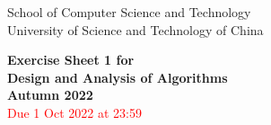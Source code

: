 \documentclass[a4paper,10pt]{article}
\begin{document}
\begin{minipage}[b]{0.58\textwidth}
	\centering
	\large
	School of Computer Science and Technology\\University of Science and Technology of China
\end{minipage}

\hrulefill

\vspace{0.2cm}
\begin{center}
	{\large \bf Exercise Sheet 1 for \\[1mm]
		Design and Analysis of Algorithms\\[0.5mm]
		Autumn 2022}\\
	\textcolor{red}{Due 1 Oct 2022 at 23:59}
	\bigskip


\end{center}
\vspace{0.1cm}



\hrulefill\medskip


\newcommand{\Alg}{\ensuremath{\mathcal{A}}}
\end{document}
